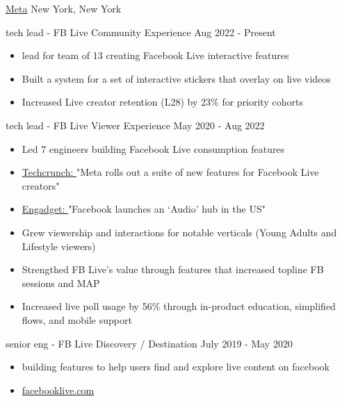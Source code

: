 \documentclass[11pt]{article}
\begin{document}
\headedsection  %
{\href{http://www.about.fb.com/}{Meta}}
{New York, New York}
{
    \headedsubsection
    {tech lead - FB Live Community Experience}
    {Aug 2022 - Present}
    {
        \begin{itemize}
            \item lead for team of 13 creating Facebook Live interactive features
            \item Built a system for a set of interactive stickers that overlay on live videos
            \item Increased Live creator retention (L28) by 23\% for priority cohorts
        \end{itemize}

    }
    \headedsubsection
    {tech lead - FB Live Viewer Experience}
    {May 2020 - Aug 2022}
    {
        \begin{itemize}
            \item Led 7 engineers building Facebook Live consumption features
            \item 
                \href{https://techcrunch.com/2021/12/09/meta-rolls-out-a-suite-of-new-features-and-discovery-tools-for-facebook-live-creators}{Techcrunch: }
                "Meta rolls out a suite of new features for Facebook Live creators"
            \item 
                \href{https://www.engadget.com/facebook-audio-content-hub-live-audio-rooms-podcasts-170633543.html}
                {Engadget: }
                "Facebook launches an ‘Audio’ hub in the US"
            \item Grew viewership and interactions for notable verticals (Young Adults and Lifestyle viewers)
            \item Strengthed FB Live's value through features that increased topline FB sessions and MAP
            \item Increased live poll usage by 56\% through in-product education, simplified flows, and mobile support
        \end{itemize}
    }
    \headedsubsection
    {senior eng - FB Live Discovery / Destination} 
    {July 2019 - May 2020}
    {
        \begin{itemize}
            \item building features to help users find and explore live content on facebook 
            \item {\href{http://www.facebooklive.com/}{facebooklive.com}}
        \end{itemize}

    }
}
\end{document}
